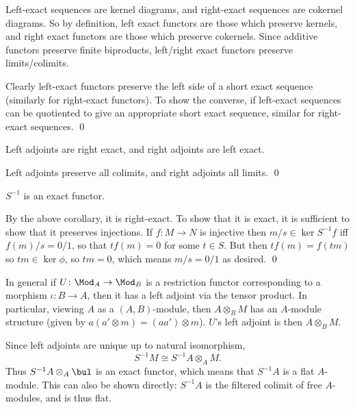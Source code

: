 \eprop

\bproof

    Left-exact sequences are kernel diagrams, and right-exact sequences are cokernel diagrams.
    So by definition, left exact functors are those which preserve kernels, and right exact functors are those which preserve cokernels.
    Since additive functors preserve finite biproducts, left/right exact functors preserve limits/colimits.

    Clearly left-exact functors preserve the left side of a short exact sequence (similarly for right-exact functors).
    To show the converse, if left-exact sequences can be quotiented to give an appropriate short exact sequence, similar for right-exact
    sequences.
    \qed

\eproof

\bcoro

    Left adjoints are right exact, and right adjoints are left exact.

\ecoro

\bproof

    Left adjoints preserve all colimits, and right adjoints all limits.
    \qed

\eproof

\bcoro

    $S^{-1}$ is an exact functor.

\ecoro

\bproof

    By the above corollary, it is right-exact.
    To show that it is exact, it is sufficient to show that it preserves injections.
    If $f\colon M\to N$ is injective then $m/s\in\ker S^{-1}f$ iff $f(m)/s=0/1$, so that $tf(m)=0$ for some $t\in S$.
    But then $tf(m)=f(tm)$ so $tm\in\ker\phi$, so $tm=0$, which means $m/s=0/1$ as desired.
    \qed

\eproof

In general if $U\colon\Mod_A\to\Mod_B$ is a restriction functor corresponding to a morphism $\iota\colon B\to A$, then it has a left adjoint
via the tensor product.
In particular, viewing $A$ as a $(A,B)$-module, then $A\otimes_BM$ has an $A$-module structure (given by $a(a'\otimes m)=(aa')\otimes m$).
$U$'s left adjoint is then $A\otimes_BM$.

Since left adjoints are unique up to natural isomorphism,
$$ S^{-1}M \cong S^{-1}A\otimes_AM . $$
Thus $S^{-1}A\otimes_A\bul$ is an exact functor, which means that $S^{-1}A$ is a {\emphcolor flat} $A$-module.
This can also be shown directly: $S^{-1}A$ is the filtered colimit of free $A$-modules, and is thus flat.

